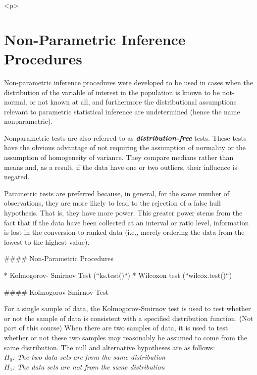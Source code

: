 \documentclass[a4paper,12pt]{article}
\begin{document}
\tableofcontents
<p>

\section{Non-Parametric Inference Procedures}
Non-parametric inference procedures were developed to be used in cases when the distribution of the variable of interest in the population is known to be not-normal, or not known at all, and furthermore the distributional assumptions relevant to parametric statistical inference are undetermined (hence the name nonparametric).

Nonparametric tests are also referred to as \textbf{\emph{distribution-free}} tests. These tests have the obvious advantage of not requiring the assumption of normality or the assumption of homogeneity of variance. They compare medians rather than means and, as a result, if the data have one or two outliers, their influence is negated.

Parametric tests are preferred because, in general, for the same number of observations, they are more likely to lead to the rejection of a false hull hypothesis. That is, they have more power. This greater power stems from the fact that if the data have been collected at an interval or ratio level, information is lost in the conversion to ranked data (i.e., merely ordering the data from the lowest to the highest value).


#### {Non-Parametric Procedures}
\begin{itemize}
* Kolmogorov- Smirnov Test (``ks.test()``)
* Wilcoxon test (``wilcox.test()``)
\end{itemize}


#### {Kolmogorov-Smirnov Test}

For a single sample of data, the Kolmogorov-Smirnov test is used to test whether or not the sample of data is consistent with a specified distribution function. (Not part of this course)
When there are two samples of data, it is used to test whether or not these two samples may reasonably be assumed to come from the same distribution.
The null and alternative hypotheses are as follows:\\
\emph{
$H_0$: The two data sets are from the same distribution\\
$H_1$: The data sets are not from the same distribution\\
}
\end{document}

